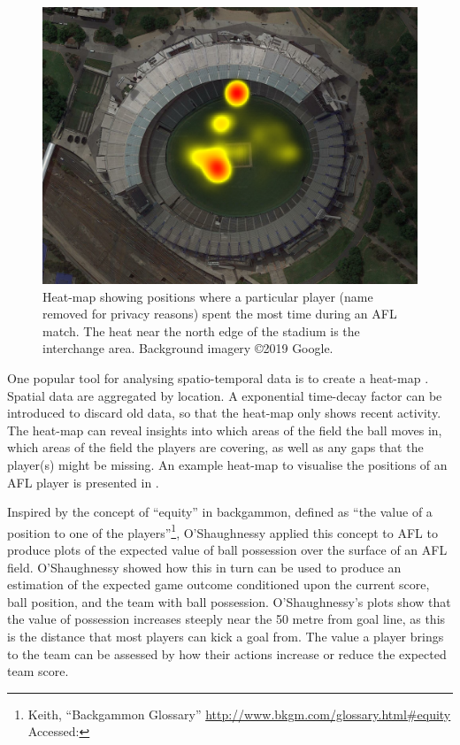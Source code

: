 \begin{figure}[htbp]
\centering
\includegraphics[width=0.9\linewidth]{figs/model/heatmap2.png}
\caption{Heat-map showing positions where a particular player (name removed for privacy reasons) spent the most
time during an AFL match.
The heat near the north edge of the
stadium is the interchange area. Background imagery \copyright{}2019 Google. \label{fig:heatmap}}
\end{figure}

One popular tool for analysing spatio-temporal data is to create a
heat-map \cite{Jackson2016}. Spatial data are aggregated by location. A exponential
time-decay factor can be introduced to discard old data, so that the
heat-map only shows recent activity. The heat-map can reveal insights
into which areas of the field the ball moves in, which areas of the
field the players are covering, as well as any gaps that the player(s)
might be missing. An example heat-map to visualise the
positions of an AFL player is presented in .

Inspired by the concept of ``equity'' in backgammon, defined as ``the value of a position to one of the players''\footnote{Keith, ``Backgammon Glossary'' \url{http://www.bkgm.com/glossary.html\#equity} Accessed: }, O'Shaughnessy applied this concept to AFL
\cite{oshaughnessy_possession_2006} to produce plots of the expected value of ball possession over the surface of an AFL field. O'Shaughnessy showed how this in turn can be used to produce an estimation of the expected game outcome conditioned upon the current score, ball position, and the team with ball possession. O'Shaughnessy's plots show that the value of possession increases steeply near the 50 metre from goal line, as this is the distance that most players can kick a goal from. The value a player brings to the team can be assessed by how their actions increase or reduce the expected team score.


